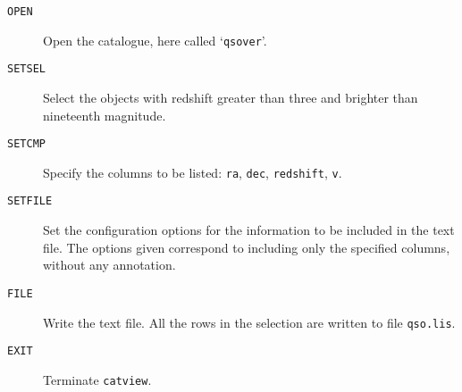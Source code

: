 \documentclass[twoside,11pt]{starlink}
\begin{document}
\begin{description}

  \item[ \texttt{OPEN} ] Open the catalogue, here called `\texttt{qsover}'.

  \item[ \texttt{SETSEL} ] Select the objects with redshift greater than
   three and brighter than nineteenth magnitude.

  \item[ \texttt{SETCMP} ] Specify the columns to be listed: \texttt{ra},
   \texttt{dec}, \texttt{redshift}, \texttt{v}.

  \item[ \texttt{SETFILE} ] Set the configuration options for the
   information to be included in the text file.  The options given
   correspond to including only the specified columns, without any
   annotation.

  \item[ \texttt{FILE} ] Write the text file.  All the rows in the
   selection are written to file \texttt{qso.lis}.

  \item[ \texttt{EXIT} ] Terminate \texttt{catview}.

\end{description}
\end{document}
